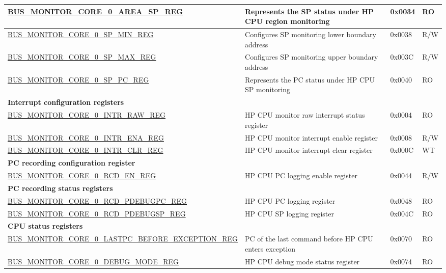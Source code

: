 \begin{longtable}{ |p{9.5cm} | p{11.6cm}| l | l | }
\hyperref[regdesc:BUSMONITORCORE0AREASPREG]{BUS\_MONITOR\_CORE\_0\_AREA\_SP\_REG} & Represents the SP status under HP CPU region monitoring & 0x0034 & RO \\ \hline
\hyperref[regdesc:BUSMONITORCORE0SPMINREG]{BUS\_MONITOR\_CORE\_0\_SP\_MIN\_REG} & Configures SP monitoring lower boundary address & 0x0038 & R/W \\ \hline
\hyperref[regdesc:BUSMONITORCORE0SPMAXREG]{BUS\_MONITOR\_CORE\_0\_SP\_MAX\_REG} & Configures SP monitoring upper boundary address & 0x003C & R/W \\ \hline
\hyperref[regdesc:BUSMONITORCORE0SPPCREG]{BUS\_MONITOR\_CORE\_0\_SP\_PC\_REG} & Represents the PC status under HP CPU SP monitoring & 0x0040 & RO \\ \hline
\multicolumn{4}{|l|}{\textbf{Interrupt configuration registers}} \\ \hline
\hyperref[regdesc:BUSMONITORCORE0INTRRAWREG]{BUS\_MONITOR\_CORE\_0\_INTR\_RAW\_REG} & HP CPU monitor raw interrupt status register & 0x0004 & RO \\ \hline
\hyperref[regdesc:BUSMONITORCORE0INTRENAREG]{BUS\_MONITOR\_CORE\_0\_INTR\_ENA\_REG} & HP CPU monitor interrupt enable register & 0x0008 & R/W \\ \hline
\hyperref[regdesc:BUSMONITORCORE0INTRCLRREG]{BUS\_MONITOR\_CORE\_0\_INTR\_CLR\_REG} & HP CPU monitor interrupt clear register & 0x000C & WT \\ \hline
\multicolumn{4}{|l|}{\textbf{PC recording configuration register}} \\ \hline
\hyperref[regdesc:BUSMONITORCORE0RCDENREG]{BUS\_MONITOR\_CORE\_0\_RCD\_EN\_REG} & HP CPU PC logging enable register & 0x0044 & R/W \\ \hline
\multicolumn{4}{|l|}{\textbf{PC recording status registers}} \\ \hline
\hyperref[regdesc:BUSMONITORCORE0RCDPDEBUGPCREG]{BUS\_MONITOR\_CORE\_0\_RCD\_PDEBUGPC\_REG} & HP CPU PC logging register & 0x0048 & RO \\ \hline
\hyperref[regdesc:BUSMONITORCORE0RCDPDEBUGSPREG]{BUS\_MONITOR\_CORE\_0\_RCD\_PDEBUGSP\_REG} & HP CPU SP logging register & 0x004C & RO \\ \hline
\multicolumn{4}{|l|}{\textbf{CPU status registers}} \\ \hline
\hyperref[regdesc:BUSMONITORCORE0LASTPCBEFOREEXCEPTIONREG]{BUS\_MONITOR\_CORE\_0\_LASTPC\_BEFORE\_EXCEPTION\_REG} & PC of the last command before HP CPU enters exception & 0x0070 & RO \\ \hline
\hyperref[regdesc:BUSMONITORCORE0DEBUGMODEREG]{BUS\_MONITOR\_CORE\_0\_DEBUG\_MODE\_REG} & HP CPU debug mode status register & 0x0074 & RO \\ \hline

\end{longtable}
